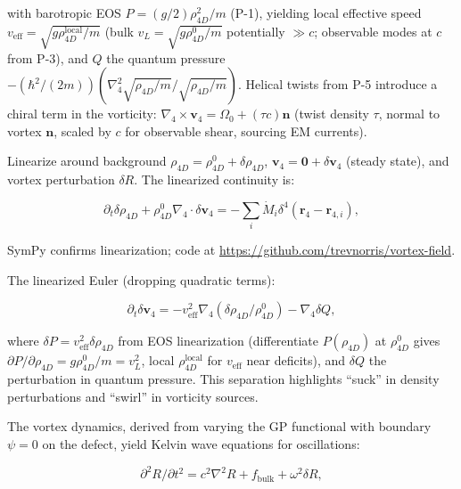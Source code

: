 with barotropic EOS $P = (g/2) \rho_{4D}^2 / m$ (P-1), yielding local effective speed $v_{\text{eff}} = \sqrt{g \rho_{4D}^{\text{local}} / m}$ (bulk $v_L = \sqrt{g \rho_{4D}^0 / m}$ potentially $\gg c$; observable modes at $c$ from P-3), and $Q$ the quantum pressure $-(\hbar^2 / (2m)) (\nabla_4^2 \sqrt{\rho_{4D}/m} / \sqrt{\rho_{4D}/m})$. Helical twists from P-5 introduce a chiral term in the vorticity: $\nabla_4 \times \mathbf{v}_4 = \Omega_0 + (\tau c) \mathbf{n}$ (twist density $\tau$, normal to vortex $\mathbf{n}$, scaled by $c$ for observable shear, sourcing EM currents).

Linearize around background $\rho_{4D} = \rho_{4D}^0 + \delta \rho_{4D}$, $\mathbf{v}_4 = \mathbf{0} + \delta \mathbf{v}_4$ (steady state), and vortex perturbation $\delta R$. The linearized continuity is:

\begin{equation}
\partial_t \delta \rho_{4D} + \rho_{4D}^0 \nabla_4 \cdot \delta \mathbf{v}_4 = -\sum_i \dot{M}_i \delta^4(\mathbf{r}_4 - \mathbf{r}_{4,i}),
\end{equation}

SymPy confirms linearization; code at \url{https://github.com/trevnorris/vortex-field}.

The linearized Euler (dropping quadratic terms):

\begin{equation}
\partial_t \delta \mathbf{v}_4 = -v_{\text{eff}}^2 \nabla_4 (\delta \rho_{4D} / \rho_{4D}^0) - \nabla_4 \delta Q,
\end{equation}

where $\delta P = v_{\text{eff}}^2 \delta \rho_{4D}$ from EOS linearization (differentiate $P(\rho_{4D})$ at $\rho_{4D}^0$ gives $\partial P / \partial \rho_{4D} = g \rho_{4D}^0 / m = v_L^2$, local $\rho_{4D}^{\text{local}}$ for $v_{\text{eff}}$ near deficits), and $\delta Q$ the perturbation in quantum pressure. This separation highlights ``suck'' in density perturbations and ``swirl'' in vorticity sources.

The vortex dynamics, derived from varying the GP functional with boundary $\psi=0$ on the defect, yield Kelvin wave equations for oscillations:

\begin{equation}
\partial^2 R / \partial t^2 = c^2 \nabla^2 R + f_{\text{bulk}} + \omega^2 \delta R,
\end{equation}

